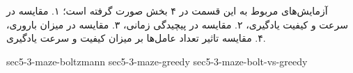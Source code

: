 آزمایش‌های مربوط به این قسمت در ۴ بخش صورت گرفته است؛ ۱. مقایسه در سرعت و کیفیت یادگیری، ۲. مقایسه در پیچیدگی زمانی، ۳. مقایسه در میزان باروری، ۴. مقایسه تاثیر تعداد عامل‌ها بر میزان کیفیت و سرعت یادگیری.

{sec5-3-maze-boltzmann}
{sec5-3-maze-greedy}
{sec5-3-maze-bolt-vs-greedy}